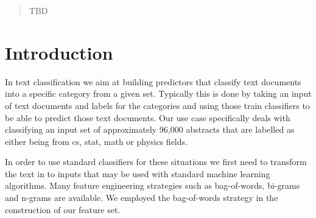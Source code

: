 \documentclass{acm_proc_article-sp}
\begin{document}
\date{30 July 1999}

\maketitle
\begin{abstract}
TBD
\end{abstract}

%
%


\section{Introduction}
In text classification we aim at building predictors that classify text documents into a specific category from a given set. Typically this is done by taking an input of text documents and labels for the categories and using those train classifiers to be able to predict those text documents. Our use case specifically deals with classifying an input set of approximately 96,000 abstracts that are labelled as either being from cs, stat, math or physics fields. 

In order to use standard classifiers for these situations we first need to transform the text in to inputs that may be used with standard machine learning algorithms. Many feature engineering strategies such as bag-of-words, bi-grams and n-grams are available. We employed the bag-of-words strategy in the construction of our feature set. 
\end{document}
